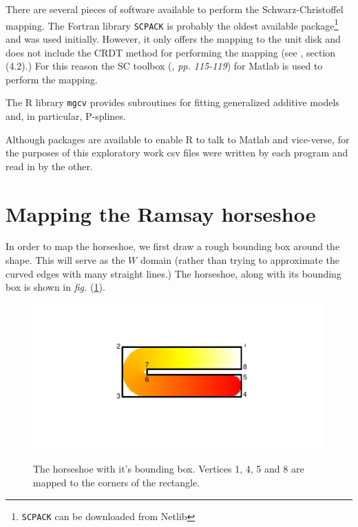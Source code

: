 \documentclass[a4paper,10pt]{amsart}
\newcommand{\sch}{Schwarz-Christoffel }
\newcommand{\fig}[1]{\emph{fig.} (\ref{#1})}
\begin{document}
There are several pieces of software available to perform the \sch mapping. The Fortran library \texttt{SCPACK} is probably the oldest available package\footnote{\texttt{SCPACK} can be downloaded from Netlib} and was used initially. However, it only offers the mapping to the unit disk and does not include the CRDT method for performing the mapping (see \cite{miller08}, section (4.2).) For this reason the SC toolbox (\cite{driscoll}, \emph{pp. 115-119}) for Matlab is used to perform the mapping. 

The \textsf{R} library \texttt{mgcv} provides subroutines for fitting generalized additive models and, in particular, P-splines.

Although packages are available to enable \textsf{R} to talk to Matlab and vice-verse, for the purposes of this exploratory work csv files were written by each program and read in by the other.

\section{Mapping the Ramsay horseshoe}

In order to map the horseshoe, we first draw a rough bounding box around the shape. This will serve as the $W$ domain (rather than trying to approximate the curved edges with many straight lines.) The horseshoe, along with its bounding box is shown in \fig{hswithboundingbox}.

\begin{figure}
\centering
\includegraphics[trim=0.5in 1in 0in 1in]{figs/hswithboundingbox.pdf} \\
\caption{The horseshoe with it's bounding box. Vertices 1, 4, 5 and 8 are mapped to the corners of the rectangle.}
\label{hswithboundingbox}
\end{figure}
\end{document}
